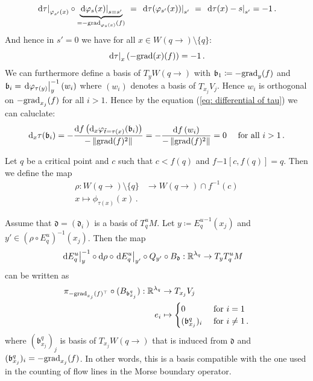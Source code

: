 \begin{remark}
	\begin{equation*}
		\left.\mathop{}\!\mathrm{d} \tau\right|_{\varphi_{s'}(x)}\circ \underbrace{\left.\mathop{}\!\mathrm{d} \varphi_s(x)\right|_{s=s'}}_{=-\mathrm{grad}_{\varphi_s(x)}(f)}~=~\left.\mathop{}\!\mathrm{d} \tau(\varphi_{s'}(x))\right|_{s'}~=~\left.\mathop{}\!\mathrm{d} \tau(x)-s\right|_{s'}=-1\,.
	\end{equation*} And hence in $s'=0$ we have for all $x\in W(q\to)\setminus \{q\}$:
	\begin{equation*}
		\left.\mathop{}\!\mathrm{d} \tau \right|_{x}(-\mathrm{grad}(x)(f))=-1\,.
	\end{equation*}
	We can furthermore define a basis of $T_yW(q\to)$ with $\mathfrak{b}_1\coloneq -\mathrm{grad}_y(f)$ and $\mathfrak{b}_i=\left.\mathop{}\!\mathrm{d} \varphi_{\tau(y)}\right|_{y}^{-1}({w_i})$ where $(w_i)$ denotes a basis of $T_{x_j}V_j$. Hence $w_i$ is orthogonal on $-\mathrm{grad}_{x_j}(f)$ for all $i>1$. Hence by the equation (\ref{eq: differential of tau}) we can caluclate:
	\begin{equation*}
		\mathop{}\!\mathrm{d}_x \tau(\mathfrak{b}_i)=-\frac{\mathop{}\!\mathrm{d} f \left( \mathop{}\!\mathrm{d}_x\varphi_{\tilde{t}=\tau(x)}(\mathfrak{b}_i) \right)}{-\left\lVert\mathrm{grad}(f)^2\right\rVert}=-\frac{\mathop{}\!\mathrm{d} f \left( w_i \right)}{-\left\lVert\mathrm{grad}(f)^2\right\rVert}=0\quad \text{ for all }i>1\,.
	\end{equation*}
\end{remark}





\begin{definition}
	Let $q$ be a critical point and $c$ such that $c<f(q)$ and $f{-1}[c,f(q)]=q$. Then we define the map
	\begin{align*}
		\rho: W(q\to)\setminus \{q\}&\to W(q\to)\cap f^{-1}(c)\\
		x\mapsto \phi_{\tau(x)}(x)\,.
	\end{align*} 
\end{definition}



\begin{lemma}\label{lem: Rho and Tau induces a Morse boundary orientation}
	Assume that $\mathfrak{d}=(\mathfrak{d}_i)$ is a basis of $T^u_qM$. Let $y\coloneq{E^u_q}^{-1}(x_j)$ and $y'\in (\rho\circ E^u_q)^{-1}(x_j)$. Then the map
	\begin{align*}
		\left.\mathop{}\!\mathrm{d} E^u_q\right|_{y}^{-1}\circ \mathop{}\!\mathrm{d} \rho \circ \left.\mathop{}\!\mathrm{d} E^u_q\right|_{y'}\circ Q_{y'}\circ B_{\mathfrak{d}}&: \mathbb{R}^{\lambda_q}\to T_yT^u_qM
	\end{align*} can be written as
	\begin{align*}
		\pi_{-\mathrm{grad}_{x_j}(f)^\top}\circ(B_{\mathfrak{b}^q_{x_j}}):
		\mathbb{R}^{\lambda_q}&     \to T_{x_j}V_j\\
		e_i           & \mapsto
		\begin{cases}
			0                                       & \text{ for }i=1\\
			({\mathfrak{b}^q_{x_j}})_i & \text{ for }i\neq 1\,.
		\end{cases}
	\end{align*} where $({\mathfrak{b}^q_{x_j}})_j$ is basis of $T_{x_j}W(q\to)$ that is induced from $\mathfrak{d}$ and $({\mathfrak{b}^q_{x_j}})_i=-\mathrm{grad}_{x_j}(f)$. In other words, this is a basis compatible with the one used in the counting of flow lines in the Morse boundary operator.
\end{lemma}

